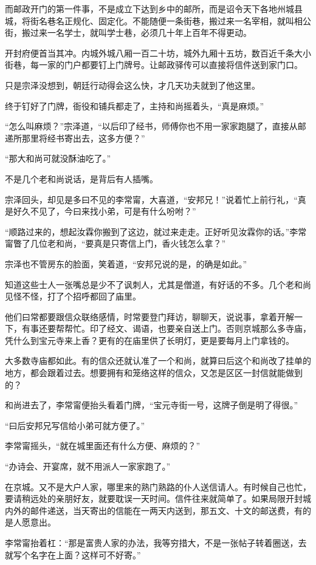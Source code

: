 而邮政开门的第一件事，不是成立下达到乡中的邮所，而是诏令天下各地州城县城，将街名巷名正规化、固定化。不能随便一条街巷，搬过来一名宰相，就叫相公街，搬过来一名学士，就叫学士巷，必须几十年上百年不得更动。

开封府便首当其冲。内城外城八厢一百二十坊，城外九厢十五坊，数百近千条大小街巷，每一家的门户都要钉上门牌号。让邮政驿传可以直接将信件送到家门口。

只是宗泽没想到，朝廷行动得会这么快，才几天功夫就到了他这里。

终于钉好了门牌，衙役和铺兵都走了，主持和尚摇着头，“真是麻烦。”

“怎么叫麻烦？”宗泽道，“以后印了经书，师傅你也不用一家家跑腿了，直接从邮递所那里将经书寄出去，这多方便？”

“那大和尚可就没酥油吃了。”

不是几个老和尚说话，是背后有人插嘴。

宗泽回头，却见是多曰不见的李常甯，大喜道，“安邦兄！”说着忙上前行礼，“真是好久不见了，今曰来找小弟，可是有什么吩咐？”

“顺路过来的，想起汝霖你搬到了这边，就过来走走。正好听见汝霖你的话。”李常甯瞥了几位老和尚，“要真是只寄信上门，香火钱怎么拿？”

宗泽也不管房东的脸面，笑着道，“安邦兄说的是，的确是如此。”

知道这些士人一张嘴总是少不了讽刺人，尤其是僧道，有好话的不多。几个老和尚见怪不怪，打了个招呼都回了庙里。

他们曰常都要跟信众联络感情，时常要登门拜访，聊聊天，说说事，拿着开解一下，有事还要帮帮忙。印了经文、谒语，也要亲自送上门。否则京城那么多寺庙，凭什么到宝元寺来上香？更有的在庙里供了长明灯，更是要每月上门拿钱的。

大多数寺庙都如此。有的信众还就认准了一个和尚，就算曰后这个和尚改了挂单的地方，都会跟着过去。想要拥有和笼络这样的信众，又怎是区区一封信就能做到的？

和尚进去了，李常甯便抬头看着门牌，“宝元寺街一号，这牌子倒是明了得很。”

“曰后安邦兄写信给小弟可就方便了。”

李常甯摇头，“就在城里面还有什么方便、麻烦的？”

“办诗会、开宴席，就不用派人一家家跑了。”

在京城。又不是大户人家，哪里来的熟门熟路的仆人送信请人。有时候自己也忙，要请稍远处的亲朋好友，就要耽误一天时间。信件往来就简单了。如果局限开封城内外的邮件递送，当天寄出的信能在一两天内送到，那五文、十文的邮送费，有的是人愿意出。

李常甯抬着杠：“那是富贵人家的办法，我等穷措大，不是一张帖子转着圈送，去就写个名字在上面？这样可不好寄。”

